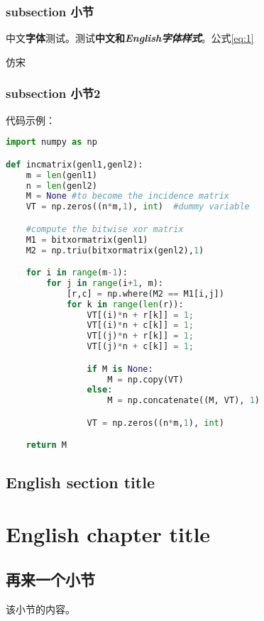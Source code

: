 \documentclass[a4paper,twoside]{ctexbook}
\begin{document}
\subsection{subsection 小节}

中文\textbf{字体}测试。测试\textbf{中文和\textit{English字体样式}}。公式\ref{eq:1}

{\fzfs 仿宋}

\subsection{subsection 小节2}

代码示例：

\begin{lstlisting}[language=Python,caption={Python example}]
import numpy as np

def incmatrix(genl1,genl2):
    m = len(genl1)
    n = len(genl2)
    M = None #to become the incidence matrix
    VT = np.zeros((n*m,1), int)  #dummy variable

    #compute the bitwise xor matrix
    M1 = bitxormatrix(genl1)
    M2 = np.triu(bitxormatrix(genl2),1)

    for i in range(m-1):
        for j in range(i+1, m):
            [r,c] = np.where(M2 == M1[i,j])
            for k in range(len(r)):
                VT[(i)*n + r[k]] = 1;
                VT[(i)*n + c[k]] = 1;
                VT[(j)*n + r[k]] = 1;
                VT[(j)*n + c[k]] = 1;

                if M is None:
                    M = np.copy(VT)
                else:
                    M = np.concatenate((M, VT), 1)

                VT = np.zeros((n*m,1), int)

    return M
\end{lstlisting}


\section{English section title}

\lipsum[2-5]

\chapter{English chapter title}

{
  \hypersetup{hidelinks}
  \minitoc
}

\vspace{10ex}

\lipsum[3]


\section{再来一个小节}

该小节的内容。
\end{document}
